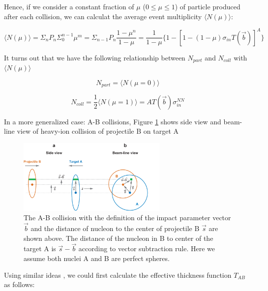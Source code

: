 Hence, if we consider a constant fraction of $\mu$ ($0 \le \mu \le 1$) of particle produced after each collision, we can calculat the average event multiplicity $\langle N(\mu) \rangle$:

\begin{equation}
\langle N(\mu) \rangle = \Sigma_n P_n \Sigma^{n-1}_0 \mu^m =  \Sigma_{n-1} P_n \frac{1 - \mu^n}{1 - \mu} = \frac{1}{1-\mu} \{ 1 - [1 - (1-\mu) \sigma_{in} T(\vec{b})]^A \}
\end{equation}

It turns out that we have the following relationship between $N_{part}$ and $N_{coll}$ with $\langle  N(\mu) \rangle$  \cite{Glauber}

\begin{equation}
N_{part} = \langle N(\mu = 0) \rangle 
\end{equation}

\begin{equation}
N_{coll} = \frac{1}{2} \langle N(\mu = 1) \rangle = A T(\vec{b}) \sigma_{in}^{NN}
\end{equation}

In a more generalized case: A-B collisions, Figure \ref{GlauberRef} shows side view and beam-line view of heavy-ion collision of projectile B on target A


\begin{figure}[hbtp]
\begin{center}
\includegraphics[width=0.65\textwidth]{Figures/Chapter1/GlauDefColl.png}
\caption{The A-B collision with the definition of the impact parameter vector $\vec{b}$ and the distance of nucleon to the center of projectile B $\vec{s}$ are shown above. The distance of the nucleon in B to center of the target A is $\vec{s}-\vec{b}$ according to vector subtraction rule. Here we assume both nuclei A and B are perfect spheres.}
\label{GlauberRef}
\end{center}
\end{figure} 

Using similar ideas \cite{CentPlot}, we could first calculate the effective thickness function $T_{AB}$ as follows:


